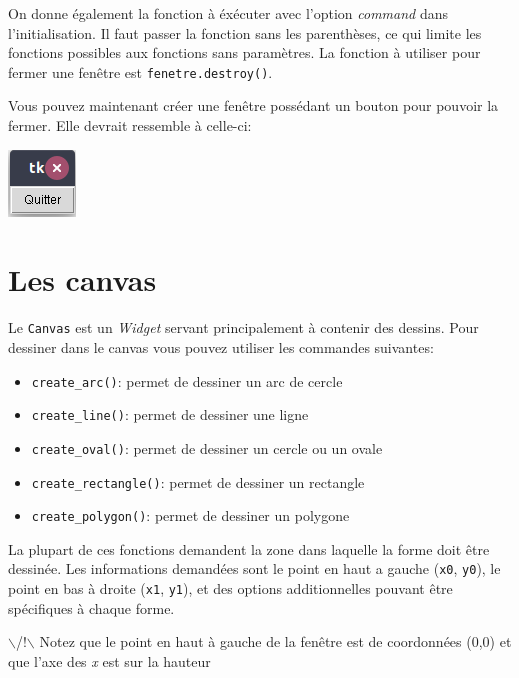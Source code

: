 \documentclass{article}
\begin{document}
\noindent
On donne également la fonction à éxécuter avec l'option \emph{command} dans l'initialisation. Il faut passer la fonction sans les parenthèses, ce qui limite les fonctions possibles aux fonctions sans paramètres. La fonction à utiliser pour fermer une fenêtre est \verb~fenetre.destroy()~.


\noindent
Vous pouvez maintenant créer une fenêtre possédant un bouton pour pouvoir la fermer. Elle devrait ressemble à celle-ci:

\begin{center}
\includegraphics[width=.3\linewidth]{./img/premiereFenetre.png}
\end{center}

\section{Les canvas}
\label{sec-3}
Le \verb~Canvas~ est un \emph{Widget} servant principalement à contenir des dessins.
Pour dessiner dans le canvas vous pouvez utiliser les commandes suivantes:
\begin{itemize}
\item \verb~create_arc()~: permet de dessiner un arc de cercle
\item \verb~create_line()~: permet de dessiner une ligne
\item \verb~create_oval()~: permet de dessiner un cercle ou un ovale
\item \verb~create_rectangle()~: permet de dessiner un rectangle
\item \verb~create_polygon()~: permet de dessiner un polygone
\end{itemize}

\noindent
La plupart de ces fonctions demandent la zone dans laquelle la forme doit être dessinée.
Les informations demandées sont le point en haut a gauche (\verb~x0~, \verb~y0~), le point en bas à droite (\verb~x1~, \verb~y1~), et des options additionnelles pouvant être spécifiques à chaque forme.

\noindent
$\backslash$/!$\backslash$ Notez que le point en haut à gauche de la fenêtre est de coordonnées (0,0) et que l'axe des \emph{x} est sur la hauteur
\end{document}
